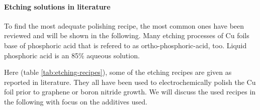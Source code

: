 % 
% 
% 
\paragraph{Etching solutions in literature} 
To find the most adequate polishing recipe, the most common ones have been reviewed and will be shown in the following. Many etching processes of Cu foils base of phosphoric acid that is refered to as ortho-phosphoric-acid, too. Liquid phosphoric acid is an 85\% aqueous solution. \cite{_7664-38-2_2014} 

Here (table \ref{tab:etching-recipes}), some of the etching recipes are given as reported in literature. They all have been used to electrochemically polish the Cu foil prior to graphene or boron nitride growth. We will discuss the used recipes in the following with focus on the additives used.

